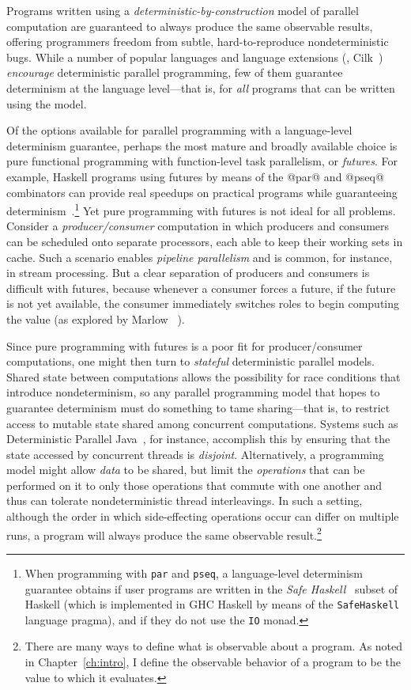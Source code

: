 Programs written using a \emph{deterministic-by-construction} model of
parallel computation are guaranteed to always produce the same
observable results, offering programmers freedom from subtle,
hard-to-reproduce nondeterministic bugs.  While a number of popular
languages and language extensions (\eg, Cilk~\cite{cilk}) \emph{encourage} deterministic parallel programming, few
of them guarantee determinism at the language level---that is, for
\emph{all} programs that can be written using the model.

Of the options available for parallel programming with a
language-level determinism guarantee, perhaps the most mature and
broadly available choice is pure functional programming with
function-level task parallelism, or \emph{futures}.  For example,
Haskell programs using futures by means of the @par@ and @pseq@
combinators can provide real speedups on practical programs while
guaranteeing determinism~\cite{marlow-par}.\footnote{When programming
  with \lstinline|par| and \lstinline|pseq|, a language-level
  determinism guarantee obtains if user programs are written in the
  \emph{Safe Haskell}~\cite{safe-haskell} subset of Haskell (which is
  implemented in GHC Haskell by means of the \lstinline|SafeHaskell|
  language pragma), and if they do not use the \lstinline|IO| monad.}
Yet pure programming with futures is not ideal for all problems.
Consider a \emph{producer/consumer} computation in which producers and
consumers can be scheduled onto separate processors, each able to keep
their working sets in cache.  Such a scenario enables \emph{pipeline
  parallelism} and is common, for instance, in stream processing.  But
a clear separation of producers and consumers is difficult with
futures, because whenever a consumer forces a future, if the future is
not yet available, the consumer immediately switches roles to begin
computing the value (as explored by Marlow \etal~\cite{monad-par}).

Since pure programming with futures is a poor fit for
producer/consumer computations, one might then turn to \emph{stateful}
deterministic parallel models.  Shared state between computations
allows the possibility for race conditions that introduce
nondeterminism, so any parallel programming model that hopes to
guarantee determinism must do something to tame sharing---that is, to
restrict access to mutable state shared among concurrent computations.
Systems such as Deterministic Parallel Java~\cite{dpj-oopsla,
  dpj-hotpar09}, for instance, accomplish this by ensuring that the
state accessed by concurrent threads is \emph{disjoint}.
Alternatively, a programming model might allow \emph{data} to be
shared, but limit the \emph{operations} that can be performed on it to
only those operations that commute with one another and thus can
tolerate nondeterministic thread interleavings.  In such a setting,
although the order in which side-effecting operations occur can differ
on multiple runs, a program will always produce the same observable
result.\footnote{There are many ways to define what is observable
  about a program. As noted in Chapter~\ref{ch:intro}, I define the
  observable behavior of a program to be the value to which it
  evaluates.}

